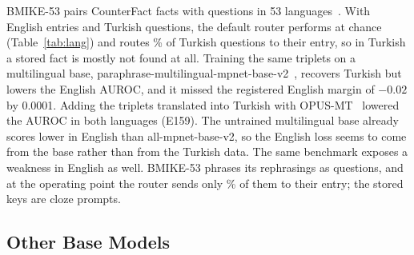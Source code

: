 \documentclass[journal,10pt]{IEEEtran}
\begin{document}
BMIKE-53 pairs CounterFact facts with questions in 53 languages~\cite{nie2025bmike}. With English entries and
Turkish questions, the default router performs at chance (Table~\ref{tab:lang}) and routes
\% of Turkish questions to their entry, so in Turkish a stored fact is
mostly not found at all. Training the same triplets on a multilingual base,
paraphrase-multilingual-mpnet-base-v2~\cite{reimers2020multilingual}, recovers Turkish but lowers the English AUROC,
and it missed the registered English margin of $-0.02$ by 0.0001. Adding the triplets translated into Turkish with
OPUS-MT~\cite{tiedemann2020opusmt} lowered the AUROC in both languages (E159). The untrained multilingual base
already scores lower in English than all-mpnet-base-v2, so the English loss seems to come from the base rather
than from the Turkish data. The same benchmark exposes a weakness in English as well. BMIKE-53 phrases its
rephrasings as questions, and at the operating point the router sends only
\% of them to their entry; the stored keys are cloze prompts.

\subsection{Other Base Models}
\label{sec:scale}
\end{document}
